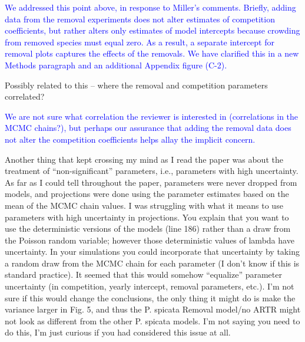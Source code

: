 \documentclass[12pt]{article}
\newcommand{\response}{\textcolor{blue}}
\begin{document}
\response{We addressed this point above, in response to Miller's comments. Briefly, adding data from the removal experiments does not alter estimates of competition coefficients, but rather alters only estimates of model intercepts because crowding from removed species must equal zero. As a result, a separate intercept for removal plots captures the effects of the removals. We have clarified this in a new Methods paragraph and an additional Appendix figure (C-2).}

Possibly related to this – where the removal and competition parameters correlated?

\response{We are not sure what correlation the reviewer is interested in 
(correlations in the MCMC chains?), but perhaps our assurance that
adding the removal data does not alter the competition coefficients 
helps allay the implicit concern.}

Another thing that kept crossing my mind as I read the paper was about the treatment of ``non-significant'' parameters, i.e., parameters with high uncertainty. As far as I could tell throughout the paper, parameters were never dropped from models, and projections were done using the parameter estimates based on the mean of the MCMC chain values. I was struggling with what it means to use parameters with high uncertainty in projections. You explain that you want to use the deterministic versions of the models (line 186) rather than a draw from the Poisson random variable; however those deterministic values of lambda have uncertainty. In your simulations you could incorporate that uncertainty by taking a random draw from the MCMC chain for each parameter (I don't know if this is standard practice). It seemed that this would somehow “equalize” parameter uncertainty (in competition, yearly intercept, removal parameters, etc.). I'm not sure if this would change the conclusions, the only thing it might do is make the variance larger in Fig. 5, and thus the P. spicata Removal model/no ARTR might not look as different from the other P. spicata models. I'm not saying you need to do this, I'm just curious if you had considered this issue at all.
\end{document}
